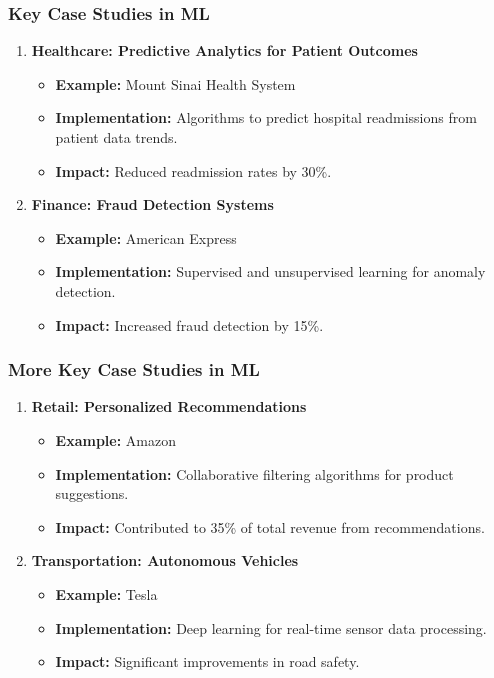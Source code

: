 \documentclass[aspectratio=169]{beamer}
\begin{document}
\begin{frame}[fragile]
    \frametitle{Key Case Studies in ML}
    \begin{enumerate}
        \item \textbf{Healthcare: Predictive Analytics for Patient Outcomes}
            \begin{itemize}
                \item \textbf{Example:} Mount Sinai Health System
                \item \textbf{Implementation:} Algorithms to predict hospital readmissions from patient data trends.
                \item \textbf{Impact:} Reduced readmission rates by 30\%.
            \end{itemize}
        \item \textbf{Finance: Fraud Detection Systems}
            \begin{itemize}
                \item \textbf{Example:} American Express
                \item \textbf{Implementation:} Supervised and unsupervised learning for anomaly detection.
                \item \textbf{Impact:} Increased fraud detection by 15\%.
            \end{itemize}
    \end{enumerate}
\end{frame}

\begin{frame}[fragile]
    \frametitle{More Key Case Studies in ML}
    \begin{enumerate}[resume]
        \item \textbf{Retail: Personalized Recommendations}
            \begin{itemize}
                \item \textbf{Example:} Amazon
                \item \textbf{Implementation:} Collaborative filtering algorithms for product suggestions.
                \item \textbf{Impact:} Contributed to 35\% of total revenue from recommendations.
            \end{itemize}
        \item \textbf{Transportation: Autonomous Vehicles}
            \begin{itemize}
                \item \textbf{Example:} Tesla
                \item \textbf{Implementation:} Deep learning for real-time sensor data processing.
                \item \textbf{Impact:} Significant improvements in road safety.
            \end{itemize}
    \end{enumerate}
\end{frame}
\end{document}
